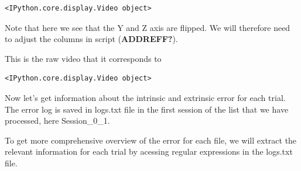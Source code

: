 \documentclass[
  letterpaper,
  DIV=11,
  numbers=noendperiod]{scrreprt}
\begin{document}
\begin{verbatim}
<IPython.core.display.Video object>
\end{verbatim}

Note that here we see that the Y and Z axis are flipped. We will
therefore need to adjust the columns in script (\textbf{ADDREFF?}).

This is the raw video that it corresponds to

\begin{verbatim}
<IPython.core.display.Video object>
\end{verbatim}

Now let's get information about the intrinsic and extrinsic error for
each trial. The error log is saved in logs.txt file in the first session
of the list that we have processed, here Session\_0\_1.

To get more comprehensive overview of the error for each file, we will
extract the relevant information for each trial by acessing regular
expressions in the logs.txt file.
\end{document}
